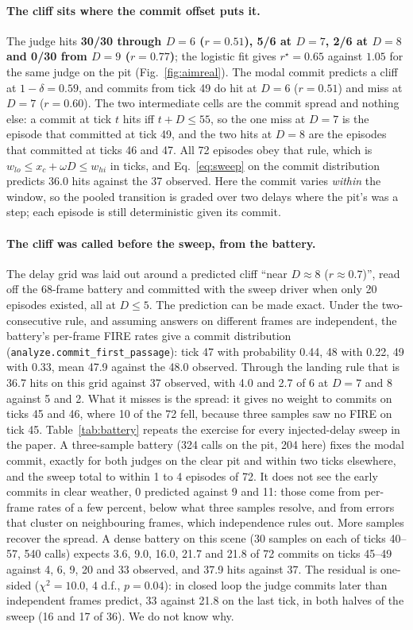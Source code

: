 \documentclass[11pt]{article}
\newcommand{\rstar}{r^{\star}}
\newcommand{\code}[1]{\texttt{#1}}
\begin{document}
\paragraph{The cliff sits where the commit offset puts it.} The judge hits
\textbf{30/30 through $D = 6$ ($r = 0.51$), 5/6 at $D = 7$, 2/6 at $D = 8$
and 0/30 from $D = 9$ ($r = 0.77$)}; the logistic fit gives
$\rstar = 0.65$ against $1.05$ for the same judge on the pit
(Fig.~\ref{fig:aimreal}). The modal commit predicts a cliff at
$1 - \delta = 0.59$, and commits from tick 49 do hit at $D = 6$
($r = 0.51$) and miss at $D = 7$ ($r = 0.60$). The two intermediate cells
are the commit spread and nothing else: a commit at tick $t$ hits iff
$t + D \le 55$, so the one miss at $D = 7$ is the episode that committed
at tick 49, and the two hits at $D = 8$ are the episodes that committed at
ticks 46 and 47. All 72 episodes obey that rule, which is
$w_{lo} \le x_c + \omega D \le w_{hi}$ in ticks, and Eq.~\ref{eq:sweep} on
the commit distribution predicts 36.0 hits against the 37 observed. Here
the commit varies \emph{within} the window, so the pooled transition is
graded over two delays where the pit's was a step; each episode is still
deterministic given its commit.

\paragraph{The cliff was called before the sweep, from the battery.} The
delay grid was laid out around a predicted cliff ``near $D \approx 8$
($r \approx 0.7$)'', read off the 68-frame battery and committed with the
sweep driver when only 20 episodes existed, all at $D \le 5$. The
prediction can be made exact. Under the two-consecutive rule, and assuming
answers on different frames are independent, the battery's per-frame FIRE
rates give a commit distribution (\code{analyze.commit\_first\_passage}):
tick 47 with probability 0.44, 48 with 0.22, 49 with 0.33, mean 47.9 against
the 48.0 observed. Through the landing rule that is 36.7 hits on this grid
against 37 observed, with 4.0 and 2.7 of 6 at $D = 7$ and $8$ against 5 and
2. What it misses is the spread: it gives no weight to commits on ticks 45
and 46, where 10 of the 72 fell, because three samples saw no FIRE on tick
45. Table~\ref{tab:battery} repeats the exercise for every injected-delay
sweep in the paper. A three-sample battery (324 calls on the pit, 204 here)
fixes the modal commit, exactly for both judges on the clear pit and within
two ticks elsewhere, and the sweep total to within 1 to 4 episodes of 72.
It does not see the early commits in clear weather, 0 predicted against 9
and 11: those come from per-frame rates of a few percent, below what three
samples resolve, and from errors that cluster on neighbouring frames, which
independence rules out. More samples recover the spread. A dense battery on
this scene (30 samples on each of ticks 40--57, 540 calls) expects 3.6, 9.0,
16.0, 21.7 and 21.8 of 72 commits on ticks 45--49 against 4, 6, 9, 20 and 33
observed, and 37.9 hits against 37. The residual is one-sided
($\chi^2 = 10.0$, 4 d.f., $p = 0.04$): in closed loop the judge commits
later than independent frames predict, 33 against 21.8 on the last tick, in
both halves of the sweep (16 and 17 of 36). We do not know why.
\end{document}
